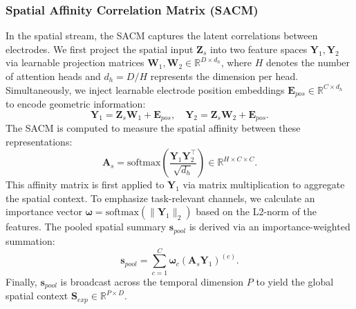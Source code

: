 \documentclass[journal]{IEEEtran}
\theoremstyle{plain}
\begin{document}
\subsubsection{Spatial Affinity Correlation Matrix (SACM)}
In the spatial stream, the SACM captures the latent correlations between electrodes. We first project the spatial input $\mathbf{Z}_s$ into two feature spaces $\mathbf{Y}_1, \mathbf{Y}_2$ via learnable projection matrices $\mathbf{W}_1, \mathbf{W}_2 \in \mathbb{R}^{D \times d_h}$, where $H$ denotes the number of attention heads and $d_h = D/H$ represents the dimension per head. Simultaneously, we inject learnable electrode position embeddings $\mathbf{E}_{pos} \in \mathbb{R}^{C \times d_h}$ to encode geometric information:
\begin{equation}
\mathbf{Y}_1 = \mathbf{Z}_s \mathbf{W}_1 + \mathbf{E}_{pos}, \quad \mathbf{Y}_2 = \mathbf{Z}_s \mathbf{W}_2 + \mathbf{E}_{pos}.
\label{eq:spatial_proj}
\end{equation}
The SACM is computed to measure the spatial affinity between these representations:
\begin{equation}
\mathbf{A}_{s} = \text{softmax}\left(\frac{\mathbf{Y}_1 \mathbf{Y}_2^\top}{\sqrt{d_h}}\right) \in \mathbb{R}^{H \times C \times C}.
\end{equation}
This affinity matrix is first applied to $\mathbf{Y}_1$ via matrix multiplication to aggregate the spatial context. To emphasize task-relevant channels, we calculate an importance vector $\boldsymbol{\omega} = \text{softmax}(\|\mathbf{Y}_1\|_2)$ based on the L2-norm of the features. The pooled spatial summary $\mathbf{s}_{pool}$ is derived via an importance-weighted summation:
\begin{equation}
\mathbf{s}_{pool} = \sum_{c=1}^C \boldsymbol{\omega}_c (\mathbf{A}_{s} \mathbf{Y}_1)^{(c)}.
\label{eq:sacm_pool}
\end{equation}
Finally, $\mathbf{s}_{pool}$ is broadcast across the temporal dimension $P$ to yield the global spatial context $\mathbf{S}_{exp} \in \mathbb{R}^{P \times D}$.
\end{document}

